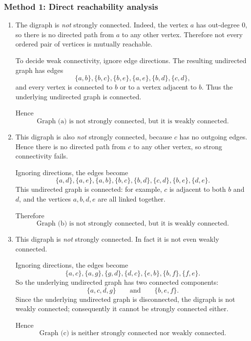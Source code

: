 \documentclass[12pt]{article}
\begin{document}
\subsubsection{Method 1: Direct reachability analysis}
\begin{enumerate}[label=(\alph*)]
\item The digraph is \emph{not} strongly connected. Indeed, the vertex \(a\) has out-degree \(0\), so there is no directed path from \(a\) to any other vertex. Therefore not every ordered pair of vertices is mutually reachable.

To decide weak connectivity, ignore edge directions. The resulting undirected graph has edges
\[
\{a,b\},\{b,c\},\{b,e\},\{a,e\},\{b,d\},\{c,d\},
\]
and every vertex is connected to \(b\) or to a vertex adjacent to \(b\). Thus the underlying undirected graph is connected.

Hence
\[
\boxed{\text{Graph (a) is not strongly connected, but it is weakly connected.}}
\]

\item This digraph is also \emph{not} strongly connected, because \(c\) has no outgoing edges. Hence there is no directed path from \(c\) to any other vertex, so strong connectivity fails.

Ignoring directions, the edges become
\[
\{a,d\},\{a,e\},\{a,b\},\{b,c\},\{b,d\},\{c,d\},\{b,e\},\{d,e\}.
\]
This undirected graph is connected: for example, \(c\) is adjacent to both \(b\) and \(d\), and the vertices \(a,b,d,e\) are all linked together.

Therefore
\[
\boxed{\text{Graph (b) is not strongly connected, but it is weakly connected.}}
\]

\item This digraph is \emph{not} strongly connected. In fact it is not even weakly connected.

Ignoring directions, the edges become
\[
\{a,c\},\{a,g\},\{g,d\},\{d,c\},\{e,b\},\{b,f\},\{f,e\}.
\]
So the underlying undirected graph has two connected components:
\[
\{a,c,d,g\}
\qquad\text{and}\qquad
\{b,e,f\}.
\]
Since the underlying undirected graph is disconnected, the digraph is not weakly connected; consequently it cannot be strongly connected either.

Hence
\[
\boxed{\text{Graph (c) is neither strongly connected nor weakly connected.}}
\]
\end{enumerate}
\end{document}
